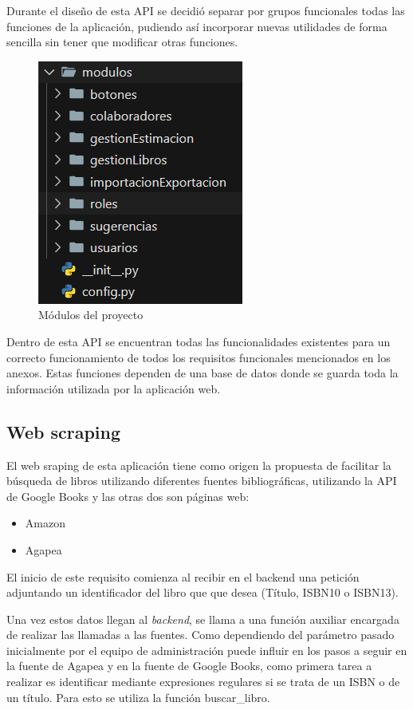 Durante el diseño de esta API se decidió separar por grupos funcionales todas las funciones de la aplicación, pudiendo así incorporar nuevas utilidades de forma sencilla sin tener que modificar otras funciones.

\begin{figure}[h]
    \centering
    \includegraphics[width=0.5\linewidth]{Imagenes/Modulos.png}
    \caption{Módulos del proyecto}
    \label{Módulos del proyecto}
\end{figure}
\FloatBarrier

Dentro de esta API se encuentran todas las funcionalidades existentes para un correcto funcionamiento de todos los requisitos funcionales mencionados en los anexos.
Estas funciones dependen de una base de datos donde se guarda toda la información utilizada por la aplicación web.

\subsection{Web scraping}
El web sraping de esta aplicación tiene como origen la propuesta de facilitar la búsqueda de libros utilizando diferentes fuentes bibliográficas, utilizando la API de Google Books y las otras dos son páginas web:
\begin{itemize}
    \item Amazon
    \item Agapea
\end{itemize}

El inicio de este requisito comienza al recibir en el backend una petición adjuntando un identificador del libro que que desea (Título, ISBN10 o ISBN13). 

Una vez estos datos llegan al \textit{backend}, se llama a una función auxiliar encargada de realizar las llamadas a las fuentes. Como dependiendo del parámetro pasado inicialmente por el equipo de administración puede influir en los pasos a seguir en la fuente de Agapea y en la fuente de Google Books, como primera tarea a realizar es identificar mediante expresiones regulares si se trata de un ISBN o de un título. Para esto se utiliza la función buscar\_libro.

